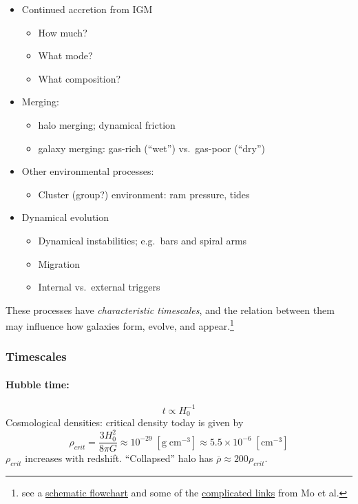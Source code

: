 \documentclass{article}
\begin{document}
\begin{itemize}
    \item Continued accretion from IGM
        \begin{itemize}
            \item How much?
            \item What mode?
            \item What composition?
        \end{itemize}
    \item Merging:
        \begin{itemize}
            \item halo merging; dynamical friction
            \item galaxy merging: gas-rich (``wet'') vs.\ gas-poor (``dry'')
        \end{itemize}
    \item Other environmental processes:
        \begin{itemize}
            \item Cluster (group?) environment: ram pressure, tides
        \end{itemize}
    \item Dynamical evolution
        \begin{itemize}
            \item Dynamical instabilities; e.g.\ bars and spiral arms
            \item Migration
            \item Internal vs.\ external triggers
        \end{itemize}
\end{itemize}
These processes have \emph{characteristic timescales}, and the relation between
them may influence how galaxies form, evolve, and appear.\footnote{
    see a \href{http://astronomy.nmsu.edu/holtz/a555/resources/mofig1.1.gif}
    {schematic flowchart} and some of the
    \href{http://astronomy.nmsu.edu/holtz/a555/resources/mofig1.1.gif}
    {complicated links} from Mo et al.}

\subsubsection{Timescales}

\paragraph{Hubble time:}
\[
    t \propto H_{0}^{-1}
    \]
Cosmological densities:
critical density today is given by
\[
    \rho_{crit} = \frac{3H_{0}^{2}}{8\pi{G}}
    \approx 10^{-29}\;[\mathrm{g\;cm}^{-3}]
    \approx 5.5\times10^{-6}\;[\mathrm{cm}^{-3}]
    \]
$\rho_{crit}$ increases with redshift. ``Collapsed'' halo has
$\overline{\rho} \approx 200\rho_{crit}$.
\end{document}
